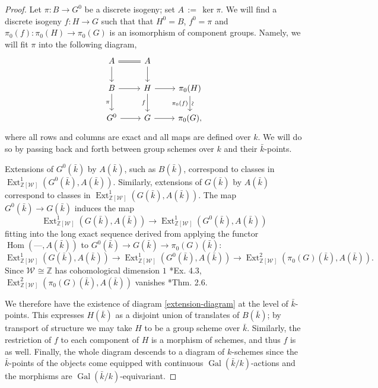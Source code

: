 \documentclass{amsart}
\theoremstyle{plain}
\theoremstyle{definition}
\theoremstyle{remark}
\newcommand{\ZZ}{{\mathbb{Z}}}
\newcommand{\bFq}{\bar{k}}
\newcommand{\Fq}{k}
\newcommand{\Weil}[1]{\mathcal{W}_{#1}}
\DeclareMathOperator{\Gal}{Gal}
\DeclareMathOperator{\Hom}{Hom}
\DeclareMathOperator{\Ext}{Ext}
\newcommand{\ceq}{{\, :=\, }}
\begin{document}
\begin{proof}
Let $\pi: B \to G^0$ be a discrete isogeny; set $A \ceq \ker \pi$.
  We will find a discrete isogeny $f: H\to G$
  such that that $H^0 = B$, $f^0 =\pi$ and
  $\pi_0(f) : \pi_0(H)\to \pi_0(G)$ is an isomorphism of component
  groups.  Namely, we will fit $\pi$ into the following diagram,
  \begin{equation}\label{extension-diagram}
  \begin{tikzcd}
  A \arrow[equal]{r} \dar & A \dar \\
  B \rar \dar[swap]{\pi} & H \rar \dar[swap]{f} & \pi_0(H) \arrow{d}[below,rotate=90]{\sim}[swap]{\pi_0(f)} \\
  G^0 \rar & G \rar & \pi_0(G),
  \end{tikzcd}
  \end{equation}
  where all rows and columns are exact and all maps are defined over
  $\Fq$.  We will do so by passing back and forth between group
  schemes over $\Fq$ and their $\bFq$-points.

  Extensions of $G^0(\bFq)$ by $A(\bFq)$, such as $B(\bFq)$,
  correspond to classes in $\Ext^1_{\ZZ[\Weil{}]}(G^0(\bFq), A(\bFq))$.
  Similarly, extensions of $G(\bFq)$ by $A(\bFq)$ correspond to
  classes in $\Ext^1_{\ZZ[\Weil{}]}(G(\bFq), A(\bFq))$.  The map
  $G^0(\bFq) \to G(\bFq)$ induces the map
  \[
  \Ext^1_{\ZZ[\Weil{}]}(G(\bFq), A(\bFq)) \to \Ext^1_{\ZZ[\Weil{}]}(G^0(\bFq), A(\bFq))
  \]
  fitting into the long exact sequence derived from applying
  the functor $\Hom(\mbox{---}, A(\bFq))$ to $G^0(\bFq) \to G(\bFq) \to \pi_0(G)(\bFq)$:
  \[
  \Ext^1_{\ZZ[\Weil{}]}(G(\bFq), A(\bFq)) \to \Ext^1_{\ZZ[\Weil{}]}(G^0(\bFq), A(\bFq)) \to \Ext^2_{\ZZ[\Weil{}]}(\pi_0(G)(\bFq), A(\bFq)).
  \]
  Since $\Weil{} \cong \ZZ$ has cohomological dimension $1$ \cite{brown:CohomologyGrps}*{Ex. 4.3},
  $\Ext^2_{\ZZ[\Weil{}]}(\pi_0(G)(\bFq), A(\bFq))$ vanishes \cite{cartan-eilenberg:HomologicalAlgebra}*{Thm. 2.6}.

  We therefore have the existence of diagram \eqref{extension-diagram}
  at the level of $\bFq$-points.  This expresses $H(\bFq)$ as a
  disjoint union of translates of $B(\bFq)$; by transport of structure
  we may take $H$ to be a group scheme over $\bFq$.  Similarly, the
  restriction of $f$ to each component of $H$ is a morphism of
  schemes, and thus $f$ is as well.  Finally, the whole diagram
  descends to a diagram of $\Fq$-schemes since the $\bFq$-points of
  the objects come equipped with continuous $\Gal(\bFq/\Fq)$-actions and the
  morphisms are $\Gal(\bFq/\Fq)$-equivariant.
\end{proof}
\end{document}
